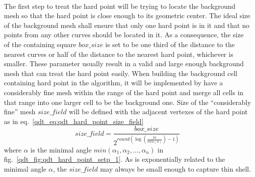 \paragraph{}
The first step to treat the hard point will be trying to locate the background mesh so that the hard point is close enough to its geometric center.
The ideal size of the background mesh shall ensure that only one hard point is in it and that no points from any other curves should be located in it.
As a consequence, the size of the containing square $box\_size$ is set to be one third of the distance to the nearest curves or half of the distance to the nearest hard point, whichever is smaller.
These parameter usually result in a valid and large enough background mesh that can treat the hard point easily. 
When building the background cell containing hard point in the algorithm, it will be implemented by have a considerably fine mesh within the range of the hard point and merge all cells in that range into one larger cell to be the background one.
Size of the ``considerably fine'' mesh $size\_field$ will be defined with the adjacent vertexes of the hard point as in eq.~\ref{qdt_eq:qdt_hard_point_size_field}
    \begin{equation}
        size\_field = \frac{box\_size}{
            2^{
                round(
                    \log(\frac{2 \pi}{ min(\alpha)})-1
                )
            }
        }
    \label{qdt_eq:qdt_hard_point_size_field}
    \end{equation}
where $\alpha$ is the minimal angle $min(\alpha_1, \alpha_2, \dots, \alpha_n)$ in fig.~\ref{qdt_fig:qdt_hard_point_setp_1}.
As is exponentially related to the minimal angle $\alpha$, the $size\_field$ may always be small enough to capture thin shell.
